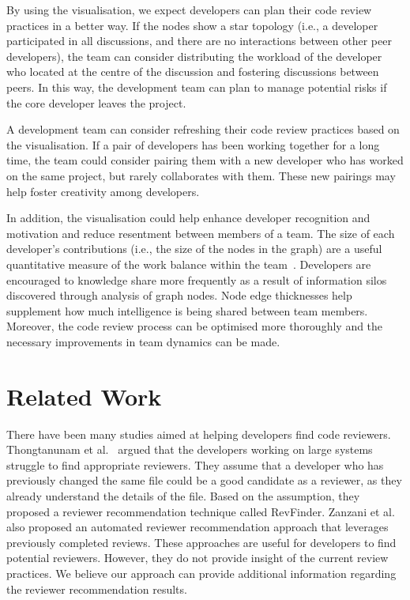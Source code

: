 \documentclass[sigconf]{acmart}
\begin{document}
By using the visualisation, we expect developers can plan their code review practices in a better way.
If the nodes show a star topology (i.e., a developer participated in all discussions, and there are no interactions between other peer developers), the team can consider distributing the workload of the developer who located at the centre of the discussion and fostering discussions between peers.
In this way, the development team can plan to manage potential risks if the core developer leaves the project.

A development team can consider refreshing their code review practices based on the visualisation.
If a pair of developers has been working together for a long time, the team could consider pairing them with a new developer who has worked on the same project, but rarely collaborates with them.
These new pairings may help foster creativity among developers.

In addition, the visualisation could help enhance developer recognition and motivation and reduce resentment between members of a team.
The size of each developer's contributions (i.e., the size of the nodes in the graph) are a useful quantitative measure of the work balance within the team~\cite{koning1993three}.
Developers are encouraged to knowledge share more frequently as a result of information silos discovered through analysis of graph nodes.
Node edge thicknesses help supplement how much intelligence is being shared between team members.
Moreover, the code review process can be optimised more thoroughly and the necessary improvements in team dynamics can be made\cite{gelbard2009interactive}.


\section{Related Work}
\label{sec:relatedWork}

There have been many studies aimed at helping developers find code reviewers.
Thongtanunam et al.~\cite{Thongtanunam15} argued that the developers working on large systems struggle to find appropriate reviewers.
They assume that a developer who has previously changed the same file could be a good candidate as a reviewer, as they already understand the details of the file.
Based on the assumption, they proposed a reviewer recommendation technique called RevFinder.
Zanzani et al.~\cite{Zanjani16} also proposed an automated reviewer recommendation approach that leverages previously completed reviews.  
These approaches are useful for developers to find potential reviewers.
However, they do not provide insight of the current review practices.
We believe our approach can provide additional information regarding the reviewer recommendation results.
\end{document}
